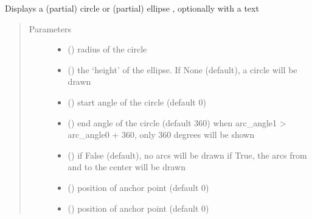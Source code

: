 \documentclass[letterpaper,10pt,english]{sphinxmanual}
\begin{document}
\begin{fulllineitems}
\label{\detokenize{Reference:salabim.AnimateCircle}}
Displays a (partial) circle or (partial) ellipse , optionally with a text
\begin{quote}\begin{description}
\item[{Parameters}] \leavevmode\begin{itemize}
\item {} 
 () \textendash{} radius of the circle

\item {} 
 () \textendash{} the ‘height’ of the ellipse. If None (default), a circle will be drawn

\item {} 
 () \textendash{} start angle of the circle (default 0)

\item {} 
 () \textendash{} end angle of the circle (default 360) 
when arc\_angle1 \textgreater{} arc\_angle0 + 360, only 360 degrees will be shown

\item {} 
 () \textendash{} if False (default), no arcs will be drawn
if True, the arcs from and to the center will be drawn

\item {} 
 () \textendash{} position of anchor point (default 0)

\item {} 
 () \textendash{} position of anchor point (default 0)


\end{itemize}
\end{description}
\end{quote}
\end{fulllineitems}
\end{document}
